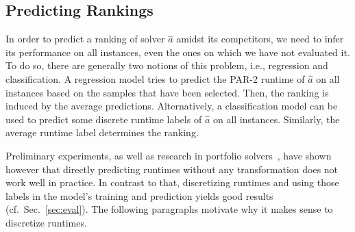 \documentclass[runningheads]{llncs}
\begin{document}
\subsection{Predicting Rankings}
\label{sec:main1}
In order to predict a ranking of solver $\hat{a}$ amidst its competitors, we need to infer its performance on all instances, even the ones on which we have not evaluated it.
To do so, there are generally two notions of this problem, i.e., regression and classification.
A regression model tries to predict the \mbox{PAR-2} runtime of $\hat{a}$ on all instances based on the samples that have been selected.
Then, the ranking is induced by the average predictions.
Alternatively, a classification model can be used to predict some discrete runtime labels of $\hat{a}$ on all instances.
Similarly, the average runtime label determines the ranking.

Preliminary experiments, as well as research in portfolio solvers~\cite{NgokoCT19,CollauttiMMO13}, have shown however that directly predicting runtimes without any transformation does not work well in practice.
In contrast to that, discretizing runtimes and using those labels in the model's training and prediction yields good results (cf.~Sec.~\ref{sec:eval}).
The following paragraphs motivate why it makes sense to discretize runtimes.
\end{document}
